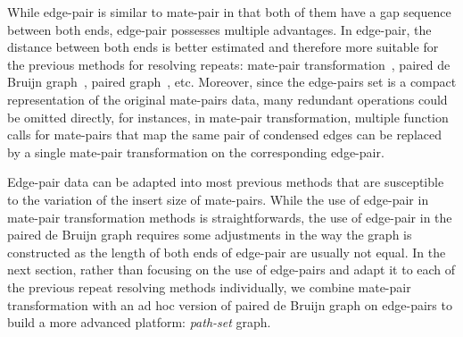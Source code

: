 \documentclass[12pt,a4paper,oneside]{article}
\begin{document}
While edge-pair is similar to mate-pair in that both of them  have a gap sequence between both ends, edge-pair possesses multiple advantages.
In edge-pair, the distance between both ends is better estimated and therefore more suitable for the previous methods for resolving repeats: mate-pair transformation~\cite{Pevzner01},
paired de Bruijn graph~\cite{Medvedev11}, paired graph~\cite{Donmez11}, etc. Moreover, since the edge-pairs set  is a compact representation of the original mate-pairs data, many 
redundant operations could be omitted directly, for instances, in mate-pair transformation, multiple function calls for mate-pairs that map the same pair of condensed edges can 
be replaced by a single mate-pair transformation on the corresponding edge-pair. 

Edge-pair data can be adapted into  most previous methods  that are susceptible to the variation of the insert size of mate-pairs. While the use of 
edge-pair in mate-pair transformation methods is straightforwards, the use of edge-pair in the paired de Bruijn graph requires some adjustments in 
the way the graph is constructed as the length of both ends of edge-pair are usually not equal. In the next section, rather than focusing 
on the use of edge-pairs and adapt it to each of the previous repeat resolving methods individually,  we combine  mate-pair 
transformation with an ad hoc version of paired de Bruijn graph on edge-pairs to build a more advanced platform: \emph{path-set} graph. 
\end{document}
